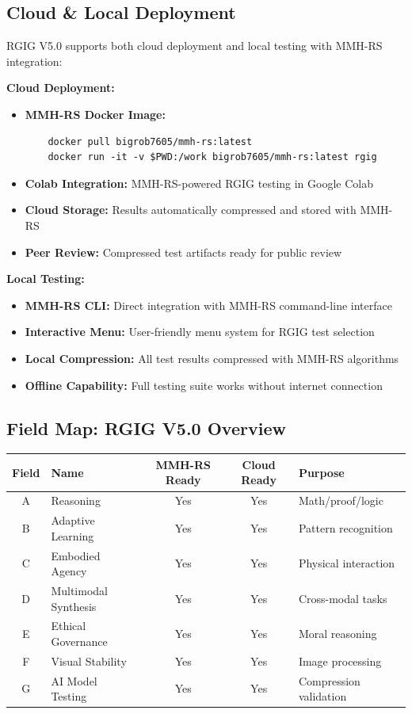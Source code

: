 \documentclass[11pt]{article}
\begin{document}
\subsection*{Cloud \& Local Deployment}
RGIG V5.0 supports both cloud deployment and local testing with MMH-RS integration:

\textbf{Cloud Deployment:}
\begin{itemize}
  \item \textbf{MMH-RS Docker Image:}
    \begin{verbatim}
    docker pull bigrob7605/mmh-rs:latest
    docker run -it -v $PWD:/work bigrob7605/mmh-rs:latest rgig
    \end{verbatim}
  \item \textbf{Colab Integration:} MMH-RS-powered RGIG testing in Google Colab
  \item \textbf{Cloud Storage:} Results automatically compressed and stored with MMH-RS
  \item \textbf{Peer Review:} Compressed test artifacts ready for public review
\end{itemize}

\textbf{Local Testing:}
\begin{itemize}
  \item \textbf{MMH-RS CLI:} Direct integration with MMH-RS command-line interface
  \item \textbf{Interactive Menu:} User-friendly menu system for RGIG test selection
  \item \textbf{Local Compression:} All test results compressed with MMH-RS algorithms
  \item \textbf{Offline Capability:} Full testing suite works without internet connection
\end{itemize}

\subsection*{Field Map: RGIG V5.0 Overview}
\begin{center}
\begin{tabular}{|c|l|c|c|l|}
\hline
Field & Name & MMH-RS Ready & Cloud Ready & Purpose \\
\hline
A & Reasoning & Yes & Yes & Math/proof/logic \\
B & Adaptive Learning & Yes & Yes & Pattern recognition \\
C & Embodied Agency & Yes & Yes & Physical interaction \\
D & Multimodal Synthesis & Yes & Yes & Cross-modal tasks \\
E & Ethical Governance & Yes & Yes & Moral reasoning \\
F & Visual Stability & Yes & Yes & Image processing \\
G & AI Model Testing & Yes & Yes & Compression validation \\
\hline
\end{tabular}
\end{center}
\end{document}
